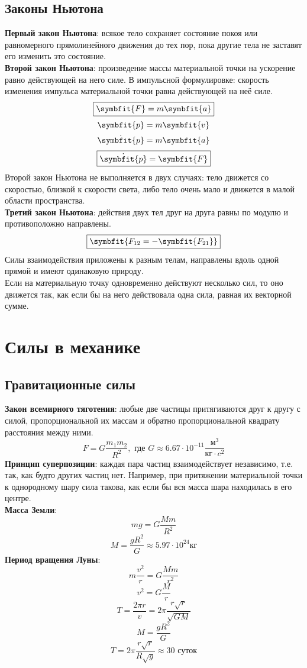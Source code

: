 \documentclass[fleqn,a4paper,12pt,titlepage,finall]{article}
\newcommand\vv[1]{\symbfit{#1}}
\begin{document}
\subsection{Законы Ньютона}
{\bf Первый закон Ньютона}: всякое тело сохраняет состояние покоя или
равномерного прямолинейного движения до тех пор, пока другие тела не заставят
его изменить это состояние. \\
{\bf Второй закон Ньютона}: произведение массы материальной точки на ускорение
равно действующей на него силе. В импульсной формулировке: скорость изменения
импульса материальной точки равна действующей на неё силе.\\
\[\boxed{\vv{F} = m\vv{a}}\]
\[\vv{p} = m\vv{v}\]
\[\dot{\vv{p}} = m\vv{a}\]
\[\boxed{\dot{\vv{p}} = \vv{F}}\]
Второй закон Ньютона не выполняется в двух случаях: тело движется со скоростью,
близкой к скорости света, либо тело очень мало и движется в малой области
пространства. \\
{\bf Третий закон Ньютона}: действия двух тел друг на друга равны по модулю и
противоположно направлены.
\[\boxed{\vv{F_{12} = -\vv{F_{21}}}}\]
Силы взаимодействия приложены к разным телам, направлены вдоль одной прямой и
имеют одинаковую природу.\\
Если на материальную точку одновременно действуют несколько сил, то оно движется
так, как если бы на него действовала одна сила, равная их векторной сумме.

\section{Силы в механике}
\subsection{Гравитационные силы}
{\bf Закон всемирного тяготения}: любые две частицы притягиваются друг к другу с
силой, пропорциональной их массам и обратно пропорциональной квадрату расстояния
между ними.
\[F = G\frac{m_1m_2}{R^2}, \text{ где } G \approx
6.67\cdot10^{-11}\frac{\text{м}^3}{\text{кг}\cdot c^2}\]
{\bf Принцип суперпозиции}: каждая пара частиц взаимодействует независимо, т.е.
так, как будто других частиц нет. Например, при притяжении материальной точки к
однородному шару сила такова, как если бы вся масса шара находилась в его
центре.\\
{\bf Масса Земли}:
\[mg = G\frac{Mm}{R^2}\]
\[M = \frac{gR^2}{G} \approx 5.97 \cdot 10^{24} \text{кг}\]
{\bf Период вращения Луны}:
\[m\frac{v^2}{r} = G\frac{Mm}{r^2}\]
\[v^2=G\frac{M}{r}\]
\[T = \frac{2\pi r}{v} = 2\pi \frac{r\sqrt{r}}{\sqrt{GM}}\]
\[M = \frac{gR^2}{G}\]
\[T = 2\pi \frac{r\sqrt{r}}{R\sqrt{g}} \approx 30 \text{ суток}\]
\end{document}
